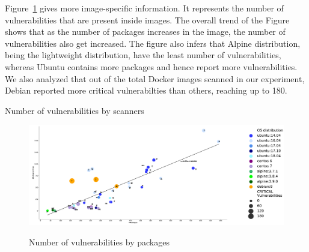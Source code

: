 \documentclass[a4paper,num-refs]{oup-contemporary}
\begin{document}
Figure~\ref{fig:graph1} gives more image-specific information.
It represents the number of vulnerabilities that are present inside images.
The overall trend of the Figure shows that as the number of packages increases in the image, the number of vulnerabilities
also get increased.
The figure also infers that Alpine distribution, being the
lightweight distribution, have the least number of vulnerabilities, whereas Ubuntu contains more packages and hence report more vulnerabilities.
We also analyzed that out of the total Docker images scanned in our experiment, Debian reported more critical vulnerabilties than others, reaching
up to 180.



\begin{table}[!ht]
%
       \centering
        \caption{\label{table1}Number of vulnerabilities by scanners}
\end{table}

\begin{figure}[!ht]
        {\includegraphics[scale=1.5,width=\textwidth]
        {Figures/vulngraph.pdf}}
        \caption{\label{fig:graph1} Number of vulnerabilities by packages}
      \end{figure}
\end{document}
